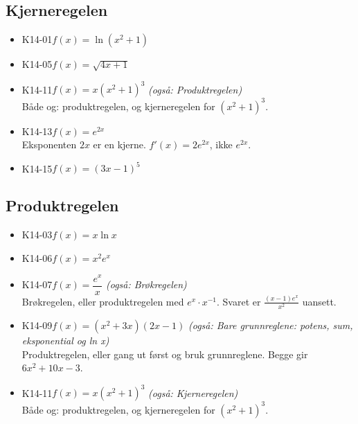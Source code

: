 \documentclass[11pt,a4paper]{article}
\begin{document}
\subsection*{Kjerneregelen}
\begin{itemize}[leftmargin=1.2em, itemsep=0.35em]
\item \textsf{\small K14-01}\quad $f(x) = \ln(x^2 + 1)$
\item \textsf{\small K14-05}\quad $f(x) = \sqrt{4x + 1}$
\item \textsf{\small K14-11}\quad $f(x) = x(x^2 + 1)^3$ \emph{(også: Produktregelen)}\\{\small\color{dempet}Både og: produktregelen, og kjerneregelen for $(x^2 + 1)^3$.}
\item \textsf{\small K14-13}\quad $f(x) = e^{2x}$\\{\small\color{dempet}Eksponenten $2x$ er en kjerne. $f'(x) = 2e^{2x}$, ikke $e^{2x}$.}
\item \textsf{\small K14-15}\quad $f(x) = (3x - 1)^5$
\end{itemize}
\subsection*{Produktregelen}
\begin{itemize}[leftmargin=1.2em, itemsep=0.35em]
\item \textsf{\small K14-03}\quad $f(x) = x \ln x$
\item \textsf{\small K14-06}\quad $f(x) = x^2 e^x$
\item \textsf{\small K14-07}\quad $f(x) = \dfrac{e^x}{x}$ \emph{(også: Brøkregelen)}\\{\small\color{dempet}Brøkregelen, eller produktregelen med $e^x \cdot x^{-1}$. Svaret er $\frac{(x - 1)e^x}{x^2}$ uansett.}
\item \textsf{\small K14-09}\quad $f(x) = (x^2 + 3x)(2x - 1)$ \emph{(også: Bare grunnreglene: potens, sum, eksponential og ln x)}\\{\small\color{dempet}Produktregelen, eller gang ut først og bruk grunnreglene. Begge gir $6x^2 + 10x - 3$.}
\item \textsf{\small K14-11}\quad $f(x) = x(x^2 + 1)^3$ \emph{(også: Kjerneregelen)}\\{\small\color{dempet}Både og: produktregelen, og kjerneregelen for $(x^2 + 1)^3$.}
\end{itemize}
\end{document}
